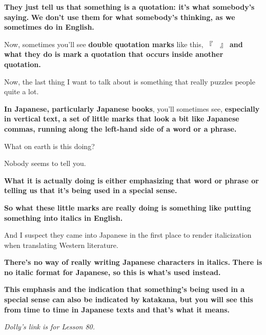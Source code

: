 {}

{\bf They just tell us that something is a quotation: it's what somebody's saying.} {\bf We don't use them for what somebody's thinking, as we sometimes do in English.}

\thinrule

Now, sometimes you'll see {\bf double quotation marks} like this, 『　』 {\bf and what they do is mark a quotation that occurs inside another quotation.}

\stopsectionlevel

\startsectionlevel[title={The side-marks},reference={the-side-marks}]

Now, the last thing I want to talk about is something that really puzzles people quite a lot.

{\bf In Japanese, particularly Japanese books}, you'll sometimes see, {\bf especially in vertical text, a set of little marks that look a bit like Japanese commas, running along the left-hand side of a word or a phrase.}

{}

What on earth is this doing?

Nobody seems to tell you.

{\bf What it is actually doing is either emphasizing that word or phrase or telling us that it's being used in a special sense.}

\thinrule

{\bf So what these little marks are really doing is something like putting something into italics in English.}

And I suspect they came into Japanese in the first place to render italicization when translating Western literature.

{\bf There's no way of really writing Japanese characters in italics.} {\bf There is no italic format for Japanese, so this is what's used instead.}

\thinrule

{\bf This emphasis and the indication that something's being used in a special sense can also be indicated by katakana, but you will see this from time to time in Japanese texts and that's what it means.}

{}

{}

{}

{\em Dolly's link is for Lesson 80.}

\stopsectionlevel

\stopsectionlevel
